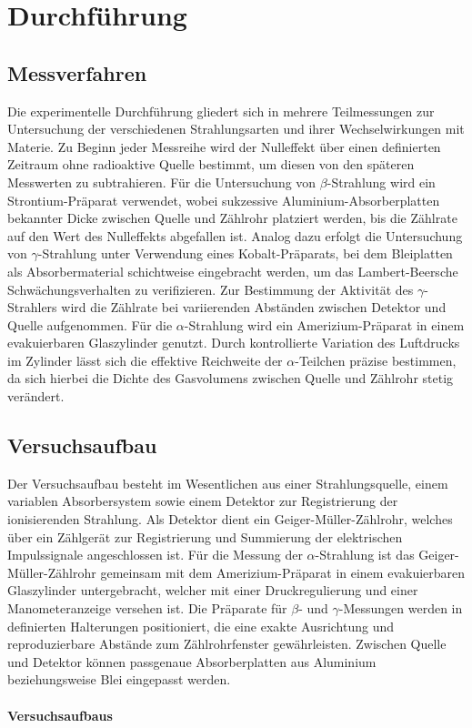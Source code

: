 \chapter{Durchführung} 
\label{ch:Durchfuehrung}

\section{Messverfahren}
\label{sec:Messverfahren}
Die experimentelle Durchführung gliedert sich in mehrere Teilmessungen zur Untersuchung der verschiedenen Strahlungsarten und ihrer Wechselwirkungen mit Materie. Zu Beginn jeder Messreihe wird der Nulleffekt über einen definierten Zeitraum ohne radioaktive Quelle bestimmt, um diesen von den späteren Messwerten zu subtrahieren. Für die Untersuchung von $\beta$-Strahlung wird ein Strontium-Präparat verwendet, wobei sukzessive Aluminium-Absorberplatten bekannter Dicke zwischen Quelle und Zählrohr platziert werden, bis die Zählrate auf den Wert des Nulleffekts abgefallen ist. Analog dazu erfolgt die Untersuchung von $\gamma$-Strahlung unter Verwendung eines Kobalt-Präparats, bei dem Bleiplatten als Absorbermaterial schichtweise eingebracht werden, um das Lambert-Beersche Schwächungsverhalten zu verifizieren. Zur Bestimmung der Aktivität des $\gamma$-Strahlers wird die Zählrate bei variierenden Abständen zwischen Detektor und Quelle aufgenommen. Für die $\alpha$-Strahlung wird ein Amerizium-Präparat in einem evakuierbaren Glaszylinder genutzt. Durch kontrollierte Variation des Luftdrucks im Zylinder lässt sich die effektive Reichweite der $\alpha$-Teilchen präzise bestimmen, da sich hierbei die Dichte des Gasvolumens zwischen Quelle und Zählrohr stetig verändert.


\section{Versuchsaufbau}
\label{sec:Versucshaufbau}
Der Versuchsaufbau besteht im Wesentlichen aus einer Strahlungsquelle, einem variablen Absorbersystem sowie einem Detektor zur Registrierung der ionisierenden Strahlung. Als Detektor dient ein Geiger-Müller-Zählrohr, welches über ein Zählgerät zur Registrierung und Summierung der elektrischen Impulssignale angeschlossen ist. Für die Messung der $\alpha$-Strahlung ist das Geiger-Müller-Zählrohr gemeinsam mit dem Amerizium-Präparat in einem evakuierbaren Glaszylinder untergebracht, welcher mit einer Druckregulierung und einer Manometeranzeige versehen ist. Die Präparate für $\beta$- und $\gamma$-Messungen werden in definierten Halterungen positioniert, die eine exakte Ausrichtung und reproduzierbare Abstände zum Zählrohrfenster gewährleisten. Zwischen Quelle und Detektor können passgenaue Absorberplatten aus Aluminium beziehungsweise Blei eingepasst werden.

\subsubsection*{Versuchsaufbaus}
\label{sec:Skizze}

